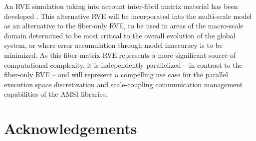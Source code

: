 \documentclass[11pt]{article}
\begin{document}
An RVE simulation taking into account inter-fibril matrix material has been developed \cite{lake2012mechanics} \cite{zhang2013cross} \cite{zhang2013coupled}. This alternative RVE will be incorporated into the multi-scale model as an alternative to the fiber-only RVE, to be used in areas of the macro-scale domain determined to be most critical to the overall evolution of the global system, or where error accumulation through model inaccuracy is to be minimized. As this fiber-matrix RVE represents a more significant source of computational complexity, it is independently parallelized -- in contrast to the fiber-only RVE -- and will represent a compelling use case for the parallel execution space discretization and scale-coupling communication management capabilities of the AMSI libraries.

\section{Acknowledgements}


\end{document}
